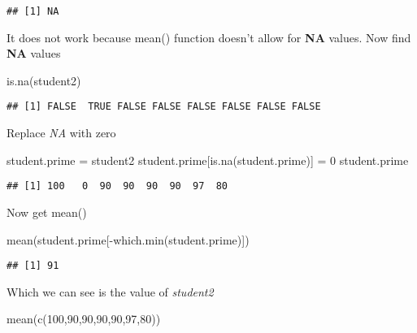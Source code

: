 \documentclass[
]{article}
\newenvironment{Shaded}{\begin{snugshade}}{\end{snugshade}}
\newcommand{\DecValTok}[1]{\textcolor[rgb]{0.00,0.00,0.81}{#1}}
\newcommand{\FunctionTok}[1]{\textcolor[rgb]{0.00,0.00,0.00}{#1}}
\newcommand{\NormalTok}[1]{#1}
\newcommand{\OtherTok}[1]{\textcolor[rgb]{0.56,0.35,0.01}{#1}}
\newcommand{\SpecialCharTok}[1]{\textcolor[rgb]{0.00,0.00,0.00}{#1}}
\begin{document}
\begin{verbatim}
## [1] NA
\end{verbatim}

It does not work because mean() function doesn't allow for \textbf{NA}
values. Now find \textbf{NA} values

\begin{Shaded}
\begin{Highlighting}[]
\FunctionTok{is.na}\NormalTok{(student2)}
\end{Highlighting}
\end{Shaded}

\begin{verbatim}
## [1] FALSE  TRUE FALSE FALSE FALSE FALSE FALSE FALSE
\end{verbatim}

Replace \emph{NA} with zero

\begin{Shaded}
\begin{Highlighting}[]
\NormalTok{student.prime }\OtherTok{=}\NormalTok{ student2}
\NormalTok{student.prime[}\FunctionTok{is.na}\NormalTok{(student.prime)] }\OtherTok{=} \DecValTok{0}
\NormalTok{student.prime}
\end{Highlighting}
\end{Shaded}

\begin{verbatim}
## [1] 100   0  90  90  90  90  97  80
\end{verbatim}

Now get mean()

\begin{Shaded}
\begin{Highlighting}[]
\FunctionTok{mean}\NormalTok{(student.prime[}\SpecialCharTok{{-}}\FunctionTok{which.min}\NormalTok{(student.prime)])}
\end{Highlighting}
\end{Shaded}

\begin{verbatim}
## [1] 91
\end{verbatim}

Which we can see is the value of \emph{student2}

\begin{Shaded}
\begin{Highlighting}[]
\FunctionTok{mean}\NormalTok{(}\FunctionTok{c}\NormalTok{(}\DecValTok{100}\NormalTok{,}\DecValTok{90}\NormalTok{,}\DecValTok{90}\NormalTok{,}\DecValTok{90}\NormalTok{,}\DecValTok{90}\NormalTok{,}\DecValTok{97}\NormalTok{,}\DecValTok{80}\NormalTok{))}
\end{Highlighting}
\end{Shaded}
\end{document}
